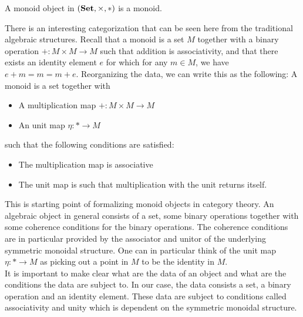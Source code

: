 \documentclass[a4paper]{article}
\begin{document}
\begin{prp}{}{} A monoid object in $(\bold{Set},\times,\ast)$ is a monoid. 
\end{prp}

There is an interesting categorization that can be seen here from the traditional algebraic structures. Recall that a monoid is a set $M$ together with a binary operation $+:M\times M\to M$ such that addition is associativity, and that there exists an identity element $e$ for which for any $m\in M$, we have $e+m=m=m+e$. Reorganizing the data, we can write this as the following: A monoid is a set together with 
\begin{itemize}
\item A multiplication map $+:M\times M\to M$
\item An unit map $\eta:\ast\to M$
\end{itemize}
such that the following conditions are satisfied: 
\begin{itemize}
\item The multiplication map is associative
\item The unit map is such that multiplication with the unit returns itself. 
\end{itemize}

This is starting point of formalizing monoid objects in category theory. An algebraic object in general consists of a set, some binary operations together with some coherence conditions for the binary operations. The coherence conditions are in particular provided by the associator and unitor of the underlying symmetric monoidal structure. One can in particular think of the unit map $\eta:\ast\to M$ as picking out a point in $M$ to be the identity in $M$. \\

It is important to make clear what are the data of an object and what are the conditions the data are subject to. In our case, the data consists a set, a binary operation and an identity element. These data are subject to conditions called associativity and unity which is dependent on the symmetric monoidal structure. 
\end{document}
